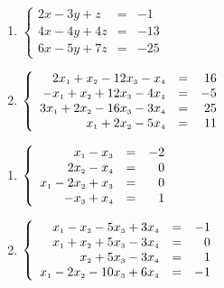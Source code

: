 \documentclass{ximera}
\begin{document}
\begin{multicols}{2}
\begin{enumerate}
\setcounter{enumi}{\value{HW}}


\item $\left\{ \begin{array}{rcr} 2x-3y+z & = & -1 \\ 4x-4y+4z & = & -13 \\ 6x-5y+7z & = & -25  \end{array} \right.$

\item  $\left\{ \begin{array}{rcr} 2x_{\mbox{\tiny$1$}} + x_{\mbox{\tiny$2$}} - 12x_{\mbox{\tiny$3$}} -  x_{\mbox{\tiny$4$}} & = & 16 \\ 
-x_{\mbox{\tiny$1$}} + x_{\mbox{\tiny$2$}} + 12x_{\mbox{\tiny$3$}} - 4x_{\mbox{\tiny$4$}} & = & -5  \\  
3x_{\mbox{\tiny$1$}} +  2x_{\mbox{\tiny$2$}} - 16x_{\mbox{\tiny$3$}} - 3x_{\mbox{\tiny$4$}} & = & 25 \\
x_{\mbox{\tiny$1$}} +  2x_{\mbox{\tiny$2$}} - 5x_{\mbox{\tiny$4$}} & = & 11  \end{array} \right.$

\setcounter{HW}{\value{enumi}}
\end{enumerate}
\end{multicols}

\begin{multicols}{2}
\begin{enumerate}
\setcounter{enumi}{\value{HW}}



\item  $\left\{ \begin{array}{rcr} x_{\mbox{\tiny$1$}} - x_{\mbox{\tiny$3$}} & = & -2 \\ 
2x_{\mbox{\tiny$2$}} - x_{\mbox{\tiny$4$}} & = & 0  \\  
x_{\mbox{\tiny$1$}} -  2x_{\mbox{\tiny$2$}} + x_{\mbox{\tiny$3$}} & = & 0 \\
-x_{\mbox{\tiny$3$}} + x_{\mbox{\tiny$4$}} & = & 1  \end{array} \right.$

\item  $\left\{ \begin{array}{rcr} x_{\mbox{\tiny$1$}} - x_{\mbox{\tiny$2$}} - 5x_{\mbox{\tiny$3$}} +  3x_{\mbox{\tiny$4$}} & = & -1 \\ 
x_{\mbox{\tiny$1$}} + x_{\mbox{\tiny$2$}} + 5x_{\mbox{\tiny$3$}} - 3x_{\mbox{\tiny$4$}} & = & 0  \\  
x_{\mbox{\tiny$2$}} + 5x_{\mbox{\tiny$3$}} - 3x_{\mbox{\tiny$4$}} & = & 1 \\
x_{\mbox{\tiny$1$}} -  2x_{\mbox{\tiny$2$}} - 10x_{\mbox{\tiny$3$}} + 6x_{\mbox{\tiny$4$}} & = & -1  \end{array} \right.$ \label{trianglast}

\setcounter{HW}{\value{enumi}}
\end{enumerate}
\end{multicols}
\end{document}
